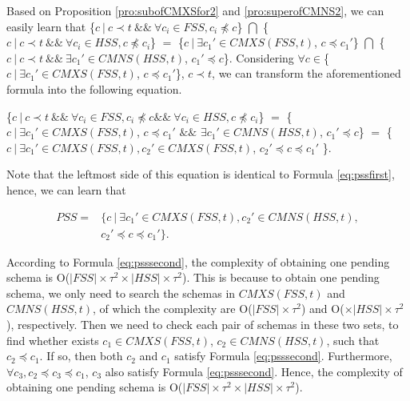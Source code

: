 \documentclass{sig-alternate-05-2015}
\begin{document}
{{Based on Proposition \ref{pro:subofCMXSfor2} and \ref{pro:superofCMNS2}, we can easily learn that \{$c\ |\ c \prec t\ \&\&\ \forall c_{i} \in FSS, c_{i} \npreceq c $\} $\bigcap$ \{$c\ |\ c \prec t\ \&\&\ \forall c_{i} \in HSS, c \npreceq c_{i} $\}  $=$  \{$ c\ |\ \exists c_{1}' \in CMXS(FSS, t)$, $c \preceq c_{1}'$\} $\bigcap$  \{$ c\ |\ c \prec t \ \&\& \ \exists c_{1}' \in CMNS(HSS, t)$, $c_{1}' \preceq c$\}. Considering $\forall c \in $\{$ c\ |\ \exists c_{1}' \in CMXS(FSS, t)$, $c \preceq c_{1}'$\}, $c \prec t$, we can transform the aforementioned formula into the following equation.

\{$c\ |\ c \prec t\ \&\&\ \forall c_{i} \in FSS, c _{i} \npreceq c \&\&\ \forall c_{i} \in HSS, c \npreceq c_{i}  $\} $=$  \{$ c\ |\ \exists c_{1}' \in CMXS(FSS, t)$, $c \preceq c_{1}'$ $\&\&$ $\exists c_{1}' \in CMNS(HSS, t)$, $c_{1}' \preceq c$\} $=$  \{$ c\ |\ \exists c_{1}' \in CMXS(FSS, t), c_{2}' \in CMXS(FSS, t)$, $c_{2}' \preceq c \preceq c_{1}'$ \}.

Note that the leftmost side of this equation is identical to Formula \ref{eq:pssfirst}, hence, we can learn that



\begin{equation}\label{eq:psssecond}
\begin{aligned}
PSS = & \{ c\ |\ \exists c_{1}' \in CMXS(FSS, t), c_{2}' \in CMNS(HSS, t), \\
    & c_{2}' \preceq c \preceq c_{1}' \}.
\end{aligned}
\end{equation}

According to Formula \ref{eq:psssecond}, the complexity of obtaining one pending schema is O($|FSS|\times \tau^{2} \times |HSS|\times \tau^{2}$). This is because to obtain one pending schema, we only need to search the schemas in $CMXS(FSS, t)$ and $CMNS(HSS, t)$, of which the complexity are O($|FSS|\times \tau^{2}$) and O($\times |HSS|\times \tau^{2}$), respectively. Then we need to check each pair of schemas in these two sets, to find whether exists $c_{1} \in CMXS(FSS, t)$, $c_{2} \in CMNS(HSS, t)$, such that $c_{2} \preceq c_{1}$. If so, then both $c_{2}$ and $c_{1}$ satisfy Formula \ref{eq:psssecond}. Furthermore, $\forall c_{3}, c_{2} \preceq c_{3} \preceq c_{1}$, $c_{3}$ also satisfy Formula \ref{eq:psssecond}. Hence, the complexity of obtaining one pending schema is O($|FSS|\times \tau^{2} \times |HSS|\times \tau^{2}$).

}}
\end{document}

